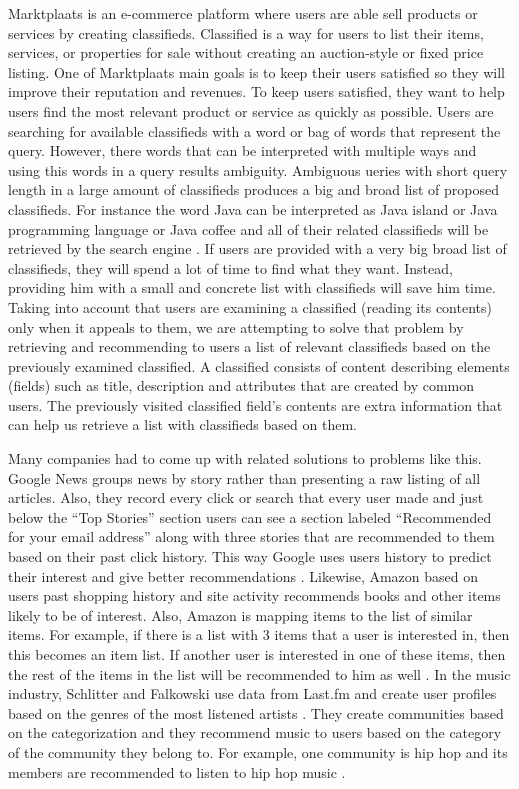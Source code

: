 Marktplaats is an e-commerce platform where users are able sell products or services by creating classifieds. Classified is a way for users to list their  items, services, or properties for sale without creating an auction-style or fixed price listing. One of Marktplaats main goals is to keep their users satisfied so they will improve their reputation and revenues. To keep users satisfied, they want to help users find the most relevant product or service as quickly as possible. Users are searching for available classifieds with a word or bag of words that represent the query. However, there words that can be interpreted with multiple ways and using this words in a query results ambiguity. Ambiguous ueries with short query length in a large amount of classifieds produces a big and broad list of proposed classifieds. For instance the word Java can be interpreted as Java island or Java programming language or Java coffee and all of their related classifieds will be retrieved by the search engine \cite{RoulSahay}. If users are provided with a very big broad list of classifieds, they will spend a lot of time to find what they want. Instead, providing him with a small and concrete list with classifieds will save him time. Taking into account that users are examining a classified (reading its contents) only when it appeals to them, we are attempting to solve that problem by retrieving and recommending to users a list of relevant classifieds based on the previously examined classified. A classified consists of content describing elements (fields) such as title, description and attributes that are created by common users. The previously visited classified field's contents are extra information that can help us retrieve a list with classifieds based on them.

Many companies had to come up with related solutions to problems like this. Google News groups news by story rather than presenting a raw listing of all articles. Also, they record every click or search that every user made and just below the ``Top Stories'' section users can see a section labeled ``Recommended for your email address'' along with three stories that are recommended to them based on their past click history. This way Google uses users history to predict their interest and give better recommendations \cite{AbhinandanGoogle}. Likewise, Amazon based on users past shopping history and site activity recommends books and other items likely to be of interest. Also, Amazon is mapping items to the list of similar items. For example, if there is a list with 3 items that a user is interested in, then this becomes an item list. If another user is interested in one of these items, then the rest of the items in the list will be recommended to him as well \cite{LindenJacobiBenson}. In the music industry, Schlitter and Falkowski use data from Last.fm and create user profiles based on the genres of the most listened artists \cite{SchlitterFalkowski}. They create communities based on the categorization and they recommend music to users based on the category of the community they belong to. For example, one community is hip hop and its members are recommended to listen to hip hop music \cite{OwenAnil}.

